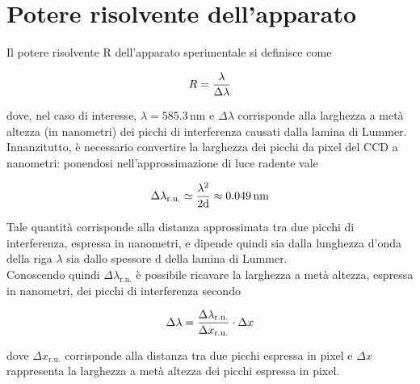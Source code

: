 \documentclass[twocolumn,10pt]{asme2ej}
\begin{document}
\vspace{-10pt}
\section{Potere risolvente dell'apparato}\label{s:risolvente}

Il potere risolvente R dell'apparato sperimentale si definisce come

\vspace{-15pt}
\begin{equation}
    R = \frac{\lambda}{\Delta\lambda}
    \label{e:r}
\vspace{-8pt}
\end{equation}

dove, nel caso di interesse, $\lambda = 585.3 \,\si{\nano\metre}$ e $\Delta\lambda$ corrisponde alla larghezza a metà
altezza (in nanometri) dei picchi di interferenza causati dalla lamina di Lummer. Innanzitutto, è necessario convertire
la larghezza dei picchi da pixel del CCD a nanometri: ponendosi nell'approssimazione di luce radente vale

\vspace{-15pt}
\begin{equation}
    \Delta\lambda_{\text{r.u.}} \simeq \frac{\lambda^2}{2\text{d}} \approx 0.049\,\si{\nano\metre}
    \label{e:dlambdaru}
\vspace{-5pt}
\end{equation}

Tale quantità corrisponde alla distanza approssimata tra due picchi di interferenza, espressa in nanometri, e dipende
quindi sia dalla lunghezza d'onda della riga $\lambda$ sia dallo spessore d della lamina di Lummer.\\
Conoscendo quindi $\Delta\lambda_{\text{r.u.}}$ è possibile ricavare la larghezza a metà altezza, espressa in nanometri,
dei picchi di interferenza secondo

\vspace{-15pt}
\begin{equation}
    \Delta\lambda = \frac{\Delta\lambda_{\text{r.u.}}}{\Delta x_{\text{r.u.}}} \cdot \Delta x
    \label{e:dlambda}
\vspace{-5pt}
\end{equation}

dove $\Delta x_{\text{r.u.}}$ corrisponde alla distanza tra due picchi espressa in pixel e $\Delta x$ rappresenta la
larghezza a metà altezza dei picchi espressa in pixel.  
\end{document}
